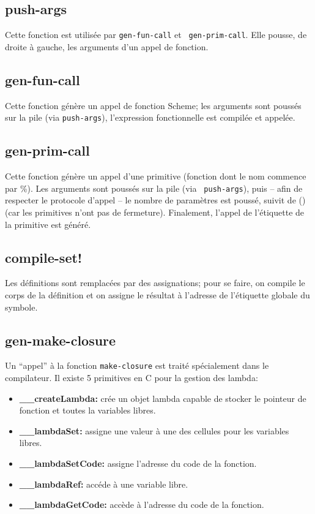 \documentclass[11pt]{report}
\begin{document}
\subsection{push-args}

Cette fonction est utilisée par {\tt gen-fun-call} et {\tt
  gen-prim-call}.  Elle pousse, de droite à gauche, les arguments d'un
appel de fonction.

\subsection{gen-fun-call}

Cette fonction génère un appel de fonction Scheme; les arguments sont
poussés sur la pile (via {\tt push-args}), l'expression fonctionnelle
est compilée et appelée.

\subsection{gen-prim-call}

Cette fonction génère un appel d'une primitive (fonction dont le nom
commence par \%).  Les arguments sont poussés sur la pile (via {\tt
  push-args}), puis -- afin de respecter le protocole d'appel -- le
nombre de paramètres est poussé, suivit de () (car les primitives
n'ont pas de fermeture).  Finalement, l'appel de l'étiquette de la
primitive est généré.

\subsection{compile-set!}

Les définitions sont remplacées par des assignations; pour se faire,
on compile le corps de la définition et on assigne le résultat à
l'adresse de l'étiquette globale du symbole.

\subsection{gen-make-closure}

Un ``appel'' à la fonction {\tt make-closure} est traité spécialement
dans le compilateur.  Il existe 5 primitives en C pour la gestion des
lambda:

\begin{itemize}
\item {\bf __createLambda:} crée un objet lambda capable de stocker le
  pointeur de fonction et toutes la variables libres.
\item {\bf __lambdaSet:} assigne une valeur à une des cellules pour
  les variables libres.
\item {\bf __lambdaSetCode:} assigne l'adresse du code de la fonction.
\item {\bf __lambdaRef:} accéde à une variable libre.
\item {\bf __lambdaGetCode:} accède à l'adresse du code de la fonction.
\end{itemize}
\end{document}
